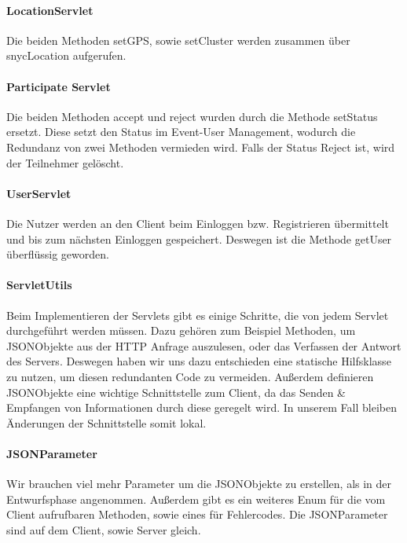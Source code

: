 \documentclass{scrartcl}
\begin{document}
	\paragraph{LocationServlet}
	Die beiden Methoden setGPS, sowie setCluster werden zusammen über snycLocation aufgerufen. %
	
	\paragraph{Participate Servlet}
	Die beiden Methoden accept und reject wurden durch die Methode setStatus ersetzt. Diese setzt den Status im Event-User Management, wodurch die Redundanz von zwei Methoden vermieden wird. Falls der Status Reject ist, wird der Teilnehmer gelöscht. 
	
	\paragraph{UserServlet}
	Die Nutzer werden an den Client beim Einloggen bzw. Registrieren übermittelt und bis zum nächsten Einloggen gespeichert. Deswegen ist die Methode getUser überflüssig geworden.
	
	\paragraph{ServletUtils}
	Beim Implementieren der Servlets gibt es einige Schritte, die von jedem Servlet durchgeführt werden müssen. Dazu gehören zum Beispiel Methoden, um JSONObjekte aus der HTTP Anfrage auszulesen, oder das Verfassen der Antwort des Servers.
	Deswegen haben wir uns dazu entschieden eine statische Hilfsklasse zu nutzen, um diesen redundanten Code zu vermeiden. Außerdem definieren JSONObjekte eine wichtige Schnittstelle zum Client, da das Senden \& Empfangen von Informationen durch diese geregelt wird. In unserem Fall bleiben Änderungen der Schnittstelle somit lokal.
	
	\paragraph{JSONParameter}
	Wir brauchen viel mehr Parameter um die JSONObjekte zu erstellen, als in der Entwurfsphase angenommen. Außerdem gibt es ein weiteres Enum für die vom Client aufrufbaren Methoden, sowie eines für Fehlercodes. Die JSONParameter sind auf dem Client, sowie Server gleich. 
		
\end{document}
